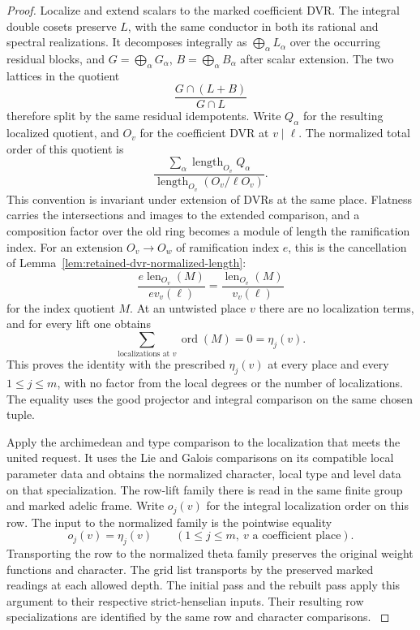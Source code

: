 \begin{proof}
Localize and extend scalars to the marked coefficient DVR.
The integral double cosets preserve \(L\), with the same conductor
in both its rational and spectral realizations. It decomposes
integrally as \(\bigoplus_\alpha L_\alpha\) over the occurring
residual blocks, and \(G=\bigoplus_\alpha G_\alpha\),
\(B=\bigoplus_\alpha B_\alpha\) after scalar extension.
The two lattices in the quotient
\[
          \frac{G\cap(L+B)}{G\cap L}
\]
therefore split by the same residual idempotents. Write \(Q_\alpha\) for the resulting localized quotient, and
\(O_v\) for the coefficient DVR at \(v\mid\ell\). The normalized total
order of this quotient is
\[
              \frac{\sum_\alpha\operatorname{length}_{O_v} Q_\alpha}
                   {\operatorname{length}_{O_v}(O_v/\ell O_v)} .
\]
 This convention is invariant under extension of DVRs
at the same place. Flatness carries the intersections and images
to the extended comparison, and a composition factor over the
old ring becomes a module of length the ramification index.
For an extension \(O_v\to O_w\) of ramification index \(e\), this
is the cancellation of Lemma~\ref{lem:retained-dvr-normalized-length}:
\[
 \frac{e\operatorname{len}_{O_v}(M)}{e v_v(\ell)}
          =\frac{\operatorname{len}_{O_v}(M)}{v_v(\ell)}
\]
for the index quotient \(M\). At an untwisted place \(v\) there are no localization terms, and for every lift one obtains
\[
 \sum_{\text{localizations at }v}\operatorname{ord}(M)=0=\eta_j(v).
\] This proves
the identity with the prescribed \(\eta_j(v)\) at every place
and every \(1\le j\le m\), with no factor from the local degrees
or the number of localizations. The equality uses the good
projector and integral comparison on the same chosen tuple.
\label{cor:automorphic-realization-42}

Apply the archimedean and type comparison to the localization that
meets the united request. It uses the Lie and Galois comparisons
on its compatible local parameter data and obtains the normalized
character, local type and level data on that specialization.
The row-lift family there is read in the same finite group and
marked adelic frame. Write \(o_j(v)\) for the integral localization order on this row. The input to the normalized family is the pointwise equality
\[
 o_j(v)=\eta_j(v)\qquad(1\le j\le m,\ v\text{ a coefficient place}).
\] Transporting the row to the normalized theta family preserves
the original weight functions and character. The grid list transports by the
preserved marked readings at each allowed depth. The initial
pass and the rebuilt pass apply this argument to their respective
strict-henselian inputs. Their resulting row specializations are identified by the same
row and character comparisons.
\label{cor:automorphic-realization-43}
\end{proof}

